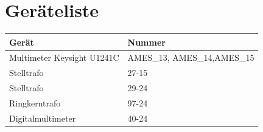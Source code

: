 \documentclass[
12pt,
a4paper,
bibliography=totoc,
listof=totoc,
headings=small,
parskip=half*, %
]{scrartcl}
\begin{document}
\printbibliography


\section*{Geräteliste}
\begin{table} [H]
	\begin{tabular}{|l|l|}
		\hline
		\textbf{Gerät }            & \textbf{Nummer }            \\ \hline
		Multimeter Keysight U1241C & AMES\_13, AMES\_14,AMES\_15 \\ \hline
		Stelltrafo                 & 27-15                       \\ \hline
		Stelltrafo                 & 29-24                       \\ \hline
		Ringkerntrafo              & 97-24                       \\ \hline
		Digitalmultimeter          & 40-24                       \\ \hline
	\end{tabular}
\end{table}
\end{document}
